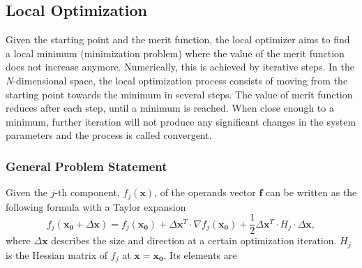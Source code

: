\subsection{Local Optimization}
\vspace{1em}
Given the starting point and the merit function, the local optimizer aims to find a local minimum (minimization problem) where the value of the merit function does not increase anymore. Numerically, this is achieved by iterative steps. In the \textit{N}-dimensional space, the local optimization process consists of moving from the starting point towards the minimum in several steps. The value of merit function reduces after each step, until a minimum is reached. When close enough to a minimum, further iteration will not produce any significant changes in  the system parameters and the process is called convergent. \newline

\subsubsection{General Problem Statement}

Given the $j$-th component, $f_{j}(\pmb{x})$, of the operands vector $\pmb{f}$ can be written as the following formula with a Taylor expansion 
\begin{equation} \label{mf_taylor_expansion}
f_{j}(\pmb{x_0}+\Delta\pmb{x}) = f_{j}(\pmb{x_0}) + \Delta\pmb{x}^T\cdot \nabla f_{j}(\pmb{x_0}) +\frac{1}{2}\Delta\pmb{x}^T\cdot H_{j} \cdot \Delta\pmb{x},
\end{equation} where $\Delta\pmb{x}$ describes the size and direction at a certain optimization iteration. $H_j$ is the Hessian matrix of $f_j$ at $\pmb{x} = \pmb{x_0}$. Its elements are \newline


